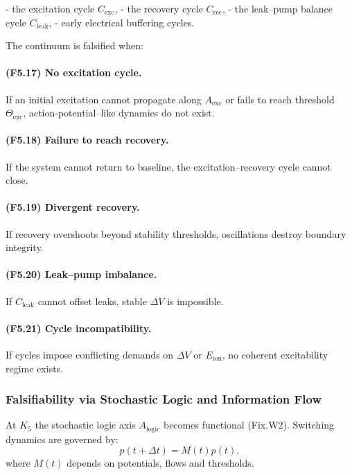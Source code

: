 - the excitation cycle $C_{\mathrm{exc}}$,
- the recovery cycle $C_{\mathrm{rec}}$,
- the leak–pump balance cycle $C_{\mathrm{leak}}$,
- early electrical buffering cycles.

The continuum is falsified when:

\paragraph{(F5.17) No excitation cycle.}
If an initial excitation cannot propagate along $A_{\mathrm{exc}}$
or fails to reach threshold $\Theta_{\mathrm{exc}}$,
action-potential–like dynamics do not exist.

\paragraph{(F5.18) Failure to reach recovery.}
If the system cannot return to baseline,
the excitation–recovery cycle cannot close.

\paragraph{(F5.19) Divergent recovery.}
If recovery overshoots beyond stability thresholds,
oscillations destroy boundary integrity.

\paragraph{(F5.20) Leak–pump imbalance.}
If $C_{\mathrm{leak}}$ cannot offset leaks,
stable $\Delta V$ is impossible.

\paragraph{(F5.21) Cycle incompatibility.}
If cycles impose conflicting demands on $\Delta V$ or $E_{\mathrm{ion}}$,
no coherent excitability regime exists.



\subsubsection{Falsifiability via Stochastic Logic and Information Flow}

At $K_5$ the stochastic logic axis $A_{\mathrm{logic}}$ becomes functional
(Fix.W2).  
Switching dynamics are governed by:
\[
p(t+\Delta t) = M(t) p(t),
\]
where $M(t)$ depends on potentials, flows and thresholds.

